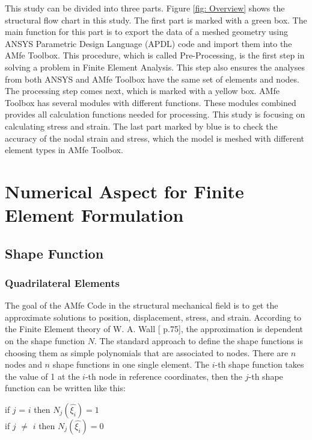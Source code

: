 This study can be divided into three parts.  Figure \ref{fig: Overview} shows the structural flow chart in this study. The first part is marked with a green box. The main function for this part is to export the data of a meshed geometry using ANSYS Parametric Design Language (APDL) code and import them into the AMfe Toolbox. This procedure, which is called Pre-Processing, is the first step in solving a problem in Finite Element Analysis. This step also ensures the analyses from both ANSYS and AMfe Toolbox have the same set of elements and nodes. The processing step comes next, which is marked with a yellow box. AMfe Toolbox has several modules with different functions. These modules combined provides all calculation functions needed for processing. This study is focusing on calculating stress and strain. The last part marked by blue is to check the accuracy of the nodal strain and stress, which the model is meshed with different element types in AMfe Toolbox.

\chapter{Numerical Aspect for Finite Element Formulation}
\section{Shape Function}
\subsection{Quadrilateral Elements}
The goal of the AMfe Code in the structural mechanical field is to get the approximate solutions to position, displacement, stress, and strain. According to the Finite Element theory of W. A. Wall [\cite{FiniteElement} p.75], the approximation is dependent on the shape function $N$. The standard approach to define the shape functions is choosing them as simple polynomials that are associated to nodes. There are $n$ nodes and $n$ shape functions in one single element. The $i$-th shape function takes the value of 1 at the $i$-th node in reference coordinates, then the $j$-th shape function can be written like this: \\

\begin{center}
	if $j$ = $i$ then $N_j\left(\hat{\xi_i}\right) = 1$ \\
	if $j$ $\neq$ $i$ then $N_j\left(\hat{\xi_i}\right) = 0$
\end{center}



